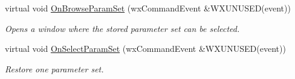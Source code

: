 \begin{DoxyCompactItemize}
\item 
\mbox{\label{class_obj_cryst_1_1_w_x_optimization_obj_aa7ea5e06a505c982e7b4eb690448b659}} 
virtual void \mbox{\hyperlink{class_obj_cryst_1_1_w_x_optimization_obj_aa7ea5e06a505c982e7b4eb690448b659}{On\+Browse\+Param\+Set}} (wx\+Command\+Event \&W\+X\+U\+N\+U\+S\+ED(event))
\begin{DoxyCompactList}\small\item\em Opens a window where the stored parameter set can be selected. \end{DoxyCompactList}\item 
\mbox{\label{class_obj_cryst_1_1_w_x_optimization_obj_af05bb52dff114d59320cb8ff9415c4fe}} 
virtual void \mbox{\hyperlink{class_obj_cryst_1_1_w_x_optimization_obj_af05bb52dff114d59320cb8ff9415c4fe}{On\+Select\+Param\+Set}} (wx\+Command\+Event \&W\+X\+U\+N\+U\+S\+ED(event))
\begin{DoxyCompactList}\small\item\em Restore one parameter set. \end{DoxyCompactList}\end{DoxyCompactItemize}
